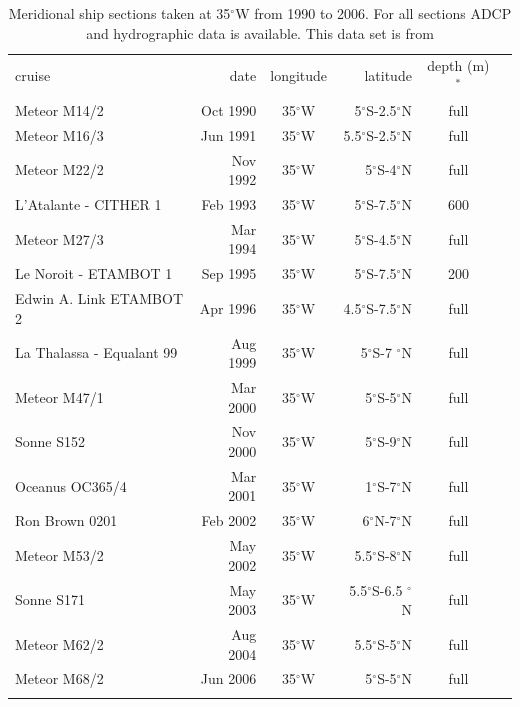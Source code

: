 \documentclass[os, manuscript]{copernicus}
\begin{document}
\clearpage
\begin{table}[t]
	\caption{Meridional ship sections taken at 35$^{\circ}$W from 1990 to 2006. For all sections ADCP and hydrographic data is available. This data set is from \cite{Hormann2007}}
	\centering
	\begin{tabular}{lrcrcc}
		\tophline
		cruise & date & longitude&latitude & depth (m)$ ^* $ \\
		\middlehline
		Meteor M14/2 & Oct 1990 & 35$^{\circ}$W & 5$^{\circ}$S-2.5$^{\circ}$N & full & \\
		Meteor M16/3 & Jun 1991& 35$^{\circ}$W & 5.5$^{\circ}$S-2.5$^{\circ}$N & full & \\
		Meteor M22/2 & Nov 1992& 35$^{\circ}$W & 5$^{\circ}$S-4$^{\circ}$N & full & \\
		L’Atalante - CITHER 1 & Feb 1993& 35$^{\circ}$W & 5$^{\circ}$S-7.5$^{\circ}$N & 600 & \\
		Meteor M27/3 & Mar 1994& 35$^{\circ}$W & 5$^{\circ}$S-4.5$^{\circ}$N & full & \\
		Le Noroit - ETAMBOT 1 & Sep 1995& 35$^{\circ}$W & 5$^{\circ}$S-7.5$^{\circ}$N & 200 & \\
		Edwin A. Link ETAMBOT 2 & Apr 1996& 35$^{\circ}$W & 4.5$^{\circ}$S-7.5$^{\circ}$N & full & \\
		La Thalassa - Equalant 99 & Aug 1999& 35$^{\circ}$W & 5$^{\circ}$S-7 $^{\circ}$N & full & \\
		Meteor M47/1 & Mar 2000& 35$^{\circ}$W & 5$^{\circ}$S-5$^{\circ}$N & full & \\
		Sonne S152 & Nov 2000& 35$^{\circ}$W & 5$^{\circ}$S-9$^{\circ}$N & full & \\
		Oceanus OC365/4 & Mar 2001& 35$^{\circ}$W & 1$^{\circ}$S-7$^{\circ}$N & full & \\
		Ron Brown 0201 & Feb 2002& 35$^{\circ}$W & 6$^{\circ}$N-7$^{\circ}$N & full & \\
		Meteor M53/2 & May 2002& 35$^{\circ}$W & 5.5$^{\circ}$S-8$^{\circ}$N & full & \\
		Sonne S171 & May 2003& 35$^{\circ}$W & 5.5$^{\circ}$S-6.5 $^{\circ}$N& full & \\
		Meteor M62/2 & Aug 2004& 35$^{\circ}$W & 5.5$^{\circ}$S-5$^{\circ}$N & full & \\
		Meteor M68/2 & Jun 2006& 35$^{\circ}$W & 5$^{\circ}$S-5$^{\circ}$N& full & \\	
		\bottomhline
	\end{tabular}
	\label{tab_cruises_35W}
\end{table}
\end{document}
